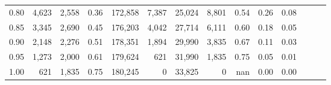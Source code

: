\begin{tabular}{rrrrrrrrrrrrrr}
0.80 &   4,623 &  2,558 &  0.36 &  172,858 &    7,387 &  25,024 &   8,801 &  0.54 &  0.26 &      0.08 \\
0.85 &   3,345 &  2,690 &  0.45 &  176,203 &    4,042 &  27,714 &   6,111 &  0.60 &  0.18 &      0.05 \\
0.90 &   2,148 &  2,276 &  0.51 &  178,351 &    1,894 &  29,990 &   3,835 &  0.67 &  0.11 &      0.03 \\
0.95 &   1,273 &  2,000 &  0.61 &  179,624 &      621 &  31,990 &   1,835 &  0.75 &  0.05 &      0.01 \\
1.00 &     621 &  1,835 &  0.75 &  180,245 &        0 &  33,825 &       0 &   nan &  0.00 &      0.00 \\
\bottomrule
\end{tabular}
